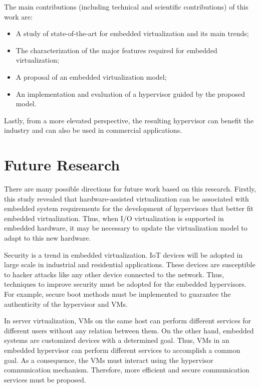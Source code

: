  The main contributions (including technical and scientific contributions) of this work are:

\begin{itemize}
    \item A study of state-of-the-art for embedded virtualization and its main trends;
    \item The characterization of the major features required for embedded virtualization;
    \item A proposal of an embedded virtualization model;
    \item An implementation and evaluation of a hypervisor guided by the proposed model.
\end{itemize}

Lastly, from a more elevated perspective, the resulting hypervisor can benefit the industry and can also be used in commercial applications. 


\section{Future Research}

There are many possible directions for future work based on this research. Firstly, this study revealed that hardware-assisted virtualization can be associated with embedded system requirements for the development of hypervisors that better fit embedded virtualization. Thus, when I/O virtualization is supported in embedded hardware, it may be necessary to update the virtualization model to adapt to this new hardware. 

Security is a trend in embedded virtualization. IoT devices will be adopted in large scale in industrial and residential applications. These devices are susceptible to hacker attacks like any other device connected to the network. Thus, techniques to improve security must be adopted for the embedded hypervisors. For example, secure boot methods must be implemented to guarantee the authenticity of the hypervisor and VMs.

In server virtualization, VMs on the same host can perform different services for different users without any relation between them. On the other hand, embedded systems are customized devices with a determined goal. Thus, VMs in an embedded hypervisor can perform different services to accomplish a common goal. As a consequence, the VMs must interact using the hypervisor communication mechanism. Therefore, more efficient and secure communication services must be proposed. 

